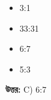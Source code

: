 \documentclass[12pt, a4paper]{article}
\begin{document}
\begin{itemize}[label={}, leftmargin=1cm, itemsep=0.5em]
    \item[\textbf{A)}] 3:1
    \item[\textbf{B)}] 33:31
    \item[\textbf{C)}] 6:7
    \item[\textbf{D)}] 5:3
\end{itemize}

\vspace{0.5em}
\begin{tcolorbox}[answerbox]
    \textbf{\color{success} উত্তর:} C) 6:7
\end{tcolorbox}
\vspace{1em}
\end{document}
